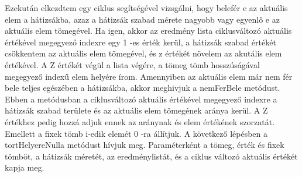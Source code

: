 Ezekután elkezdtem egy ciklus segítségével vizsgálni, hogy belefér e az aktuális elem a hátizsákba, azaz a hátizsák szabad mérete nagyobb vagy egyenlő e az aktuális elem tömegével. Ha igen, akkor az eredmény lista ciklusváltozó aktuális értékével megegyező indexre egy 1 -es érték kerül, a hátizsák szabad értékét csökkentem az aktuális elem tömegével, és z értékét növelem az akutális elem értékével. A Z értékét végül a lista végére, a tömeg tömb hosszúságával megegyező indexű elem helyére írom. Amennyiben az aktuális elem már nem fér bele teljes egészében a hátizsákba, akkor meghivjuk a nemFerBele metódust. Ebben a metódusban a ciklusváltozó aktuális értékével megegyező indexre a hátizsák szabad területe és az aktuális elem tömegének aránya kerül. A Z értékhez pedig hozzá adjuk ennek az aránynak és elem értékének szorzatát. Emellett a fixek tömb i-edik elemét 0 -ra állítjuk. A következő lépésben a tortHelyereNulla metódust hívjuk meg. Paraméterként a tömeg, érték és fixek tömböt, a hátizsák méretét, az eredménylistát, és a ciklus változó aktuális értékét kapja meg. 

